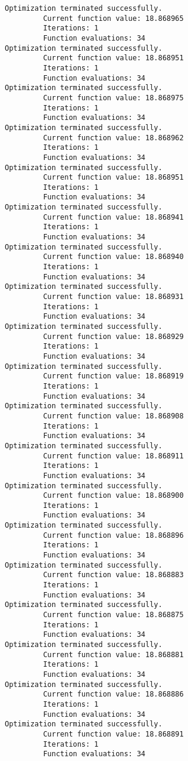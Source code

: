 \documentclass[11pt]{article}
\begin{document}
\begin{Verbatim}[commandchars=\\\{\}]
Optimization terminated successfully.
         Current function value: 18.868965
         Iterations: 1
         Function evaluations: 34
Optimization terminated successfully.
         Current function value: 18.868951
         Iterations: 1
         Function evaluations: 34
Optimization terminated successfully.
         Current function value: 18.868975
         Iterations: 1
         Function evaluations: 34
Optimization terminated successfully.
         Current function value: 18.868962
         Iterations: 1
         Function evaluations: 34
Optimization terminated successfully.
         Current function value: 18.868951
         Iterations: 1
         Function evaluations: 34
Optimization terminated successfully.
         Current function value: 18.868941
         Iterations: 1
         Function evaluations: 34
Optimization terminated successfully.
         Current function value: 18.868940
         Iterations: 1
         Function evaluations: 34
Optimization terminated successfully.
         Current function value: 18.868931
         Iterations: 1
         Function evaluations: 34
Optimization terminated successfully.
         Current function value: 18.868929
         Iterations: 1
         Function evaluations: 34
Optimization terminated successfully.
         Current function value: 18.868919
         Iterations: 1
         Function evaluations: 34
Optimization terminated successfully.
         Current function value: 18.868908
         Iterations: 1
         Function evaluations: 34
Optimization terminated successfully.
         Current function value: 18.868911
         Iterations: 1
         Function evaluations: 34
Optimization terminated successfully.
         Current function value: 18.868900
         Iterations: 1
         Function evaluations: 34
Optimization terminated successfully.
         Current function value: 18.868896
         Iterations: 1
         Function evaluations: 34
Optimization terminated successfully.
         Current function value: 18.868883
         Iterations: 1
         Function evaluations: 34
Optimization terminated successfully.
         Current function value: 18.868875
         Iterations: 1
         Function evaluations: 34
Optimization terminated successfully.
         Current function value: 18.868881
         Iterations: 1
         Function evaluations: 34
Optimization terminated successfully.
         Current function value: 18.868886
         Iterations: 1
         Function evaluations: 34
Optimization terminated successfully.
         Current function value: 18.868891
         Iterations: 1
         Function evaluations: 34

\end{Verbatim}
\end{document}
